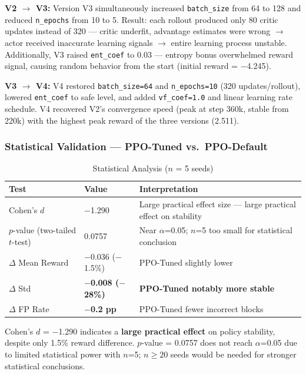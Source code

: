 \documentclass[12pt,a4paper]{report}
\begin{document}
\textbf{V2 $\to$ V3:} Version V3 simultaneously increased \texttt{batch\_size} from 64 to 128 and reduced \texttt{n\_epochs} from 10 to 5. Result: each rollout produced only 80 critic updates instead of 320 --- critic underfit, advantage estimates were wrong $\to$ actor received inaccurate learning signals $\to$ entire learning process unstable. Additionally, V3 raised \texttt{ent\_coef} to 0.03 --- entropy bonus overwhelmed reward signal, causing random behavior from the start (initial reward = $-$4.245).

\textbf{V3 $\to$ V4:} V4 restored \texttt{batch\_size=64} and \texttt{n\_epochs=10} (320 updates/rollout), lowered \texttt{ent\_coef} to safe level, and added \texttt{vf\_coef=1.0} and linear learning rate schedule. V4 recovered V2's convergence speed (peak at step 360k, stable from 220k) with the highest peak reward of the three versions (2.511).

\subsubsection{Statistical Validation --- PPO-Tuned vs.\ PPO-Default}

\begin{table}[h!]
\centering
\caption{Statistical Analysis ($n$ = 5 seeds)}
\begin{tabular}{L{4cm} C{2.5cm} L{5.5cm}}
\toprule
\textbf{Test} & \textbf{Value} & \textbf{Interpretation} \\
\midrule
Cohen's $d$ & $-$1.290 & Large practical effect size --- large practical effect on stability \\
$p$-value (two-tailed $t$-test) & 0.0757 & Near $\alpha$=0.05; $n$=5 too small for statistical conclusion \\
$\Delta$ Mean Reward & $-$0.036 ($-$1.5\%) & PPO-Tuned slightly lower \\
$\Delta$ Std & \textbf{$-$0.008 ($-$28\%)} & \textbf{PPO-Tuned notably more stable} \\
$\Delta$ FP Rate & \textbf{$-$0.2 pp} & PPO-Tuned fewer incorrect blocks \\
\bottomrule
\end{tabular}
\end{table}

Cohen's $d$ = $-$1.290 indicates a \textbf{large practical effect} on policy stability, despite only 1.5\% reward difference. $p$-value = 0.0757 does not reach $\alpha$=0.05 due to limited statistical power with $n$=5; $n \geq 20$ seeds would be needed for stronger statistical conclusions.
\end{document}
